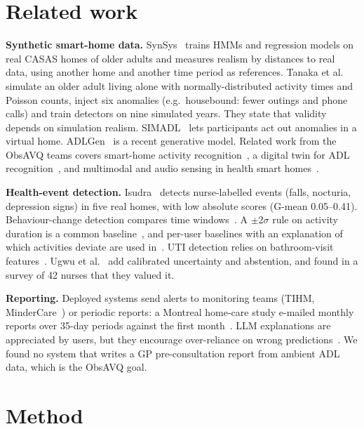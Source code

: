 \documentclass[10pt,a4paper]{article}
\begin{document}
\section{Related work}
\textbf{Synthetic smart-home data.} SynSys~\cite{dahmen2019synsys} trains HMMs and regression models on real CASAS homes
of older adults and measures realism by distances to real data, using another home and another time period as
references. Tanaka et al.~\cite{tanaka2023simulation,tanaka2024detection} simulate an older adult living alone with
normally-distributed activity times and Poisson counts, inject six anomalies (e.g.\ housebound: fewer outings and phone
calls) and train detectors on nine simulated years. They state that validity depends on simulation realism. SIMADL~\cite{alshammari2018simadl}
lets participants act out anomalies in a virtual home. ADLGen~\cite{you2025adlgen} is a recent generative model. Related work from the ObsAVQ teams covers smart-home activity recognition~\cite{bouchabou2021survey}, a digital twin for ADL
recognition~\cite{bouchabou2023twin}, and multimodal and audio sensing in health smart homes~\cite{fleury2010svm,vacher2011audio}.

\textbf{Health-event detection.} Isudra~\cite{dahmen2021isudra} detects nurse-labelled events (falls, nocturia,
depression signs) in five real homes, with low absolute scores (G-mean 0.05--0.41). Behaviour-change detection compares
time windows~\cite{sprint2016bcd}. A $\pm2\sigma$ rule on activity duration is a common baseline~\cite{shahid2022anomalies},
and per-user baselines with an explanation of which activities deviate are used in~\cite{cejudo2025anomaly}.
UTI detection relies on bathroom-visit features~\cite{capstick2024uti}. Ugwu et al.~\cite{ugwu2026clinician} add calibrated
uncertainty and abstention, and found in a survey of 42 nurses that they valued it.

\textbf{Reporting.} Deployed systems send alerts to monitoring teams (TIHM, MinderCare~\cite{mindercare}) or periodic
reports: a Montreal home-care study e-mailed monthly reports over 35-day periods against the first month~\cite{montreal2020report}.
LLM explanations are appreciated by users, but they encourage over-reliance on wrong predictions~\cite{fiori2025llm}.
We found no system that writes a GP pre-consultation report from ambient ADL data, which is the ObsAVQ goal.

\section{Method}
\end{document}
